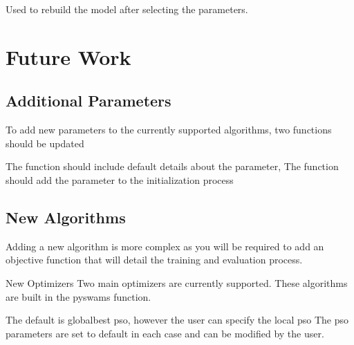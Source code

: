 \documentclass[letterpaper,10pt,english]{sphinxmanual}
\begin{document}
\begin{fulllineitems}
\begin{fulllineitems}
\end{fulllineitems}


\begin{fulllineitems}
\label{\detokenize{index:pspso.pspso.rebuildmodel}}
Used to rebuild the model after selecting the parameters.

\end{fulllineitems}


\end{fulllineitems}



\chapter{Future Work}
\label{\detokenize{index:future-work}}

\section{Additional Parameters}
\label{\detokenize{index:additional-parameters}}
To add new parameters to the currently supported algorithms, two functions should be updated

The  function should include default details about the parameter,
The  function should add the parameter to the initialization process


\section{New Algorithms}
\label{\detokenize{index:new-algorithms}}
Adding a new algorithm is more complex as you will be required to add an objective function that will detail the training and evaluation process.

New Optimizers
Two main optimizers are currently supported. These algorithms are built in the pyswams function.

The default is globalbest pso, however the user can specify the local pso
The pso parameters are set to default in each case and can be modified by the user.
\end{document}
